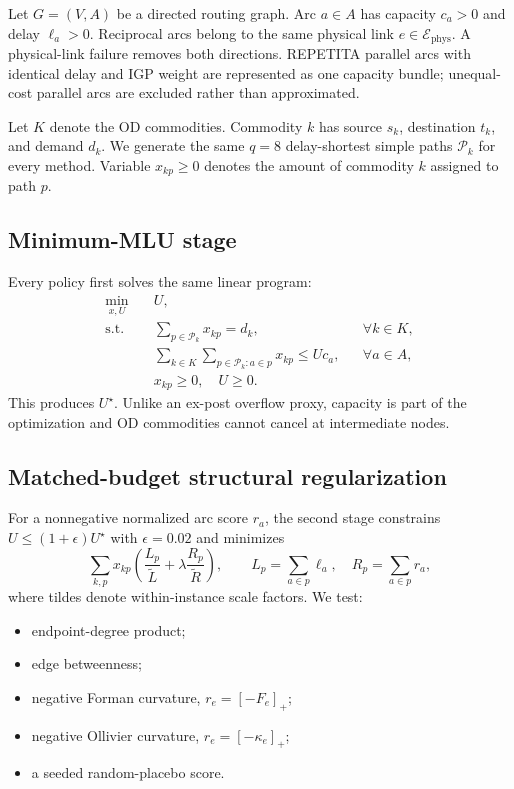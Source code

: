 \documentclass[preprint,12pt]{elsarticle}
\newcommand{\Ephys}{\mathcal{E}_{\mathrm{phys}}}
\newcommand{\Pset}{\mathcal{P}}
\begin{document}
Let $G=(V,A)$ be a directed routing graph. Arc $a\in A$ has capacity $c_a>0$
and delay $\ell_a>0$. Reciprocal arcs belong to the same physical link
$e\in\Ephys$. A physical-link failure removes both directions. REPETITA
parallel arcs with identical delay and IGP weight are represented as one
capacity bundle; unequal-cost parallel arcs are excluded rather than
approximated.

Let $K$ denote the OD commodities. Commodity $k$ has source $s_k$, destination
$t_k$, and demand $d_k$. We generate the same $q=8$ delay-shortest simple paths
$\Pset_k$ for every method. Variable $x_{kp}\geq0$ denotes the amount of
commodity $k$ assigned to path $p$.

\subsection{Minimum-MLU stage}

Every policy first solves the same linear program:
\begin{align}
 \min_{x,U}\quad & U, \\
 \text{s.t.}\quad
 & \sum_{p\in\Pset_k}x_{kp}=d_k, &&\forall k\in K, \\
 & \sum_{k\in K}\sum_{p\in\Pset_k:a\in p}x_{kp}
      \le Uc_a, &&\forall a\in A, \\
 & x_{kp}\ge0,\quad U\ge0.
 \label{eq:mlu}
\end{align}
This produces $U^\star$. Unlike an ex-post overflow proxy, capacity is part of
the optimization and OD commodities cannot cancel at intermediate nodes.

\subsection{Matched-budget structural regularization}

For a nonnegative normalized arc score $r_a$, the second stage constrains
$U\le(1+\epsilon)U^\star$ with $\epsilon=0.02$ and minimizes
\begin{equation}
 \sum_{k,p}x_{kp}\left(
   \frac{L_p}{\widetilde L}+\lambda
   \frac{R_p}{\widetilde R}\right),
 \qquad
 L_p=\sum_{a\in p}\ell_a,\quad R_p=\sum_{a\in p}r_a,
 \label{eq:risk}
\end{equation}
where tildes denote within-instance scale factors. We test:

\begin{itemize}
\item endpoint-degree product;
\item edge betweenness;
\item negative Forman curvature, $r_e=[-F_e]_+$;
\item negative Ollivier curvature, $r_e=[-\kappa_e]_+$;
\item a seeded random-placebo score.
\end{itemize}
\end{document}
